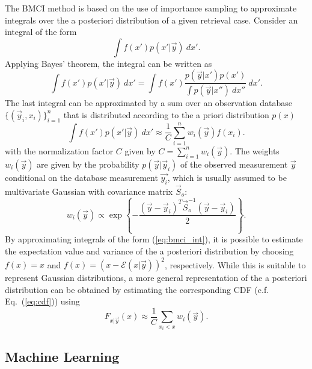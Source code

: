 \documentclass[journal abbreviation, manuscript]{copernicus}
\begin{document}
    The BMCI method is based on the use of importance sampling to approximate
    integrals over the a posteriori distribution of a given retrieval case. Consider an
    integral of the form
    \begin{equation}\label{eq:bmci_int}
     \int f(x') p(x'|\vec{y}) \: dx'.
    \end{equation}
    Applying Bayes' theorem, the integral can be written as
    \begin{equation*}
    \int f(x') p(x' | \vec{y}) \: dx' =
    \int f(x') \frac{p(\vec{y} | x')p(x')}
                    {\int p(\vec{y} | x'') \: dx''} \: dx'.
    \end{equation*}
    The last integral can be approximated by a sum over an observation
    database $\{(\vec{y}_i, x_i)\}_{i = 1}^n$ that is distributed according
    to the a priori distribution $p(x)$
    \begin{equation*}
    \int f(x') p(x' | \vec{y}) \: dx'  \approx \frac{1}{C}  \sum_{i = 1}^n w_i(\vec{y}) f(x_i).
    \end{equation*}
    with the normalization factor $C$ given by $C = \sum_{i = 1}^n w_i(\vec{y}).$
    The weights $w_i(\vec{y})$ are given by  the probability $p(\vec{y} | \vec{y}_i)$
    of the observed measurement $\vec{y}$ conditional on the database
    measurement $\vec{y_i}$, which is usually assumed to be multivariate
    Gaussian with covariance matrix $\vec{S}_o$:
    \begin{equation*}
    w_i(\vec{y}) \propto \exp \left \{- \frac{(\vec{y} - \vec{y}_i)^T \vec{S}_o^{-1}
                                       (\vec{y} - \vec{y}_i)}{2} \right \}.
    \end{equation*}
     By approximating integrals of the form (\ref{eq:bmci_int}), it is possible
    to estimate the expectation value and variance of the a posteriori distribution by
    choosing $f(x) = x$ and $f(x) = (x - \mathcal{E}(x | \vec{y}))^2$, respectively.
    While this is suitable to represent Gaussian distributions, a more general
    representation of the a posteriori distribution can be obtained by
    estimating the corresponding CDF (c.f. Eq.~(\ref{eq:cdf})) using
    \begin{equation}
    \label{eq:bmci_cdf}
    F_{x | \vec{y}}(x) \approx \frac{1}{C} \sum_{x_i < x} w_i(\vec{y}).
    \end{equation}

\subsection{Machine Learning}
\end{document}
